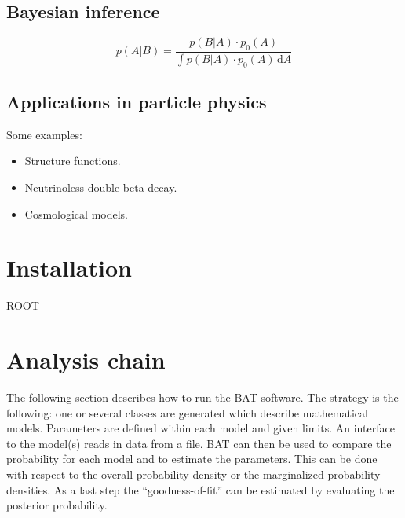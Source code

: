 \documentclass[11pt, a4paper]{article}
\begin{document}
\subsection{Bayesian inference} 

\begin{equation}
p(A|B) = \frac{p(B|A) \cdot p_{0}(A)}{\int p(B|A) \cdot p_{0}(A) \, \mathrm{d}A }
\label{eqn:BayesTheorem}
\end{equation}

\subsection{Applications in particle physics} 
\label{subsection:applications} 

Some examples: 

\begin{itemize}
\item Structure functions. 
%
\item Neutrinoless double beta-decay. 
% 
\item Cosmological models.  
\end{itemize}


\section{Installation} 

ROOT 


\section{Analysis chain}

The following section describes how to run the BAT software. The
strategy is the following: one or several classes are generated which
describe mathematical models. Parameters are defined within each model
and given limits. An interface to the model(s) reads in data from a
file. BAT can then be used to compare the probability for each model
and to estimate the parameters. This can be done with respect to the
overall probability density or the marginalized probability
densities. As a last step the ``goodness-of-fit'' can be estimated by
evaluating the posterior probability. 
\end{document}
